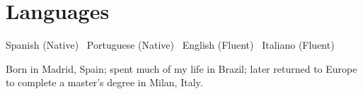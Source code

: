 \section{Languages}
\noindent Spanish (Native) \textbar\ Portuguese (Native) \textbar\ English (Fluent) \textbar\ Italiano (Fluent)

\vspace{2pt}
\noindent\small Born in Madrid, Spain; spent much of my life in Brazil; later returned to Europe to complete a master's degree in Milan, Italy.
